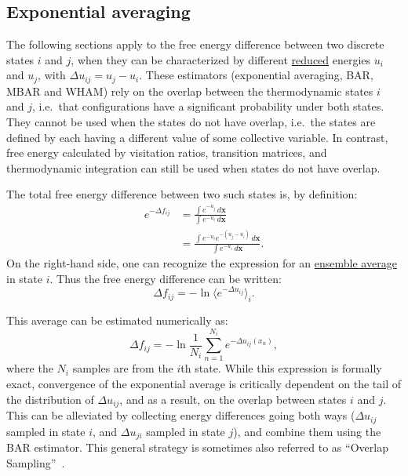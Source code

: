 \documentclass[9pt,review]{livecoms}
\newcommand{\vx}{\mathbf{x}}
\begin{document}
\subsection{Exponential averaging}
\label{sec:fe_estimators:EXP}

The following sections apply to the free energy difference between two discrete states $i$ and $j$, when they can be characterized by different \hyperlink{ref:reduced} {reduced} energies $u_i$ and $u_j$, with $\Delta u_{ij} = u_j - u_i$.
These estimators (exponential averaging, BAR, MBAR and WHAM) rely on the overlap between the thermodynamic states $i$ and $j$, i.e.~that configurations have a significant probability under both states. They cannot be used when the states do not have overlap, i.e.~the states are defined by each having a different value of some collective variable.  In contrast, free energy calculated by visitation ratios, transition matrices, and thermodynamic integration can still be used when states do not have overlap.

The total free energy difference between two such states is, by definition:
\begin{align}
    e^{-\Delta f_{ij}} &=  \frac{\int e^{-u_j} \, d\vx}{\int e^{-u_i} \, d\vx}
    \nonumber \\
    &= \frac{\int e^{-u_i}  e^{-(u_j-u_i)} \, d\vx}{\int e^{-u_i} \, d\vx}.
\end{align}
On the right-hand side, one can recognize the expression for an \hyperlink{ref:ensemble_average} {ensemble average} in state $i$.
Thus the free energy difference can be written:
\begin{equation}
    \Delta f_{ij} = -\ln \langle e^{-\Delta u_{ij}}\rangle_i.
\end{equation}

This average can be estimated numerically as:
\begin{equation}
\Delta f_{ij} = -\ln \frac{1}{N_i}\sum_{n=1}^{N_i} e^{-\Delta u_{ij}(x_n)},
\label{eq:expav}
\end{equation}
where the $N_i$ samples are from the $i$th state.
While this expression is formally exact, convergence of the exponential average is critically dependent on the tail of the distribution of $\Delta u_{ij}$, and as a result, on the overlap between states $i$ and $j$.
This can be alleviated by collecting energy differences going both ways ($\Delta u_{ij}$ sampled in state $i$, and $\Delta u_{ji}$ sampled in state $j$), and combine them using the BAR estimator.
This general strategy is sometimes also referred to as ``Overlap Sampling''~\cite{Lu2003}.
\end{document}
